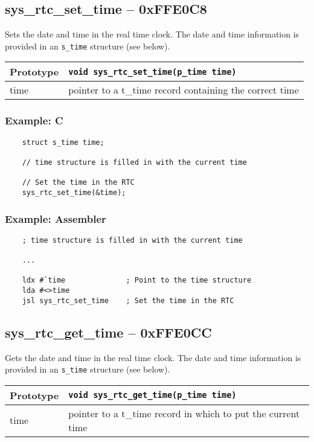 \subsection*{sys\_rtc\_set\_time -- 0xFFE0C8}
Sets the date and time in the real time clock. The date and time information is provided in an \verb+s_time+ structure (see below).

\bigskip

\begin{tabular}{|l||l|} \hline
Prototype & \lstinline!void sys_rtc_set_time(p_time time)! \\ \hline
time & pointer to a t\_time record containing the correct time \\ \hline
\end{tabular}

\subsubsection*{Example: C}
\begin{lstlisting}
    struct s_time time;
    
    // time structure is filled in with the current time

    // Set the time in the RTC
    sys_rtc_set_time(&time);
\end{lstlisting}

\subsubsection*{Example: Assembler}
\begin{verbatim}
    ; time structure is filled in with the current time

    ...

    ldx #`time              ; Point to the time structure
    lda #<>time
    jsl sys_rtc_set_time    ; Set the time in the RTC
\end{verbatim}


\subsection*{sys\_rtc\_get\_time -- 0xFFE0CC}
Gets the date and time in the real time clock. The date and time information is provided in an \verb+s_time+ structure (see below).

\bigskip

\begin{tabular}{|l||l|} \hline
Prototype & \lstinline!void sys_rtc_get_time(p_time time)! \\ \hline
time & pointer to a t\_time record in which to put the current time \\ \hline
\end{tabular}

